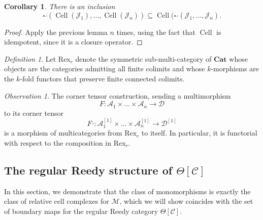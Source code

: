 \documentclass[leqno]{article}
\numberwithin{equation}{subsection}
\theoremstyle{plain}   %
\newtheorem{cor}[equation]{Corollary}
\theoremstyle{remark}
\newtheorem{obs}[equation]{Observation}
\newtheorem{defn}[equation]{Definition}
\theoremstyle{plain}
\newcommand{\Cat}{\ensuremath{\mathbf{Cat}}}
\renewcommand{\C}{\ensuremath{\mathcal{C}}}
\begin{document}
\begin{cor} 
	There is an inclusion
	\[\square^\lrcorner(\operatorname{Cell}(\mathscr{J}_1),\dots,\operatorname{Cell}(\mathscr{J}_n)) \subseteq \operatorname{Cell}(\square^\lrcorner(\mathscr{J}_1,\dots,\mathscr{J}_n).\]
\end{cor}
\begin{proof} 
	Apply the previous lemma \(n\) times, using the fact that \(\operatorname{Cell}\) is idempotent, since it is a closure operator.
\end{proof}

\begin{defn} Let \(\mathrm{Rex}_c\) denote the symmetric sub-multi-category of \(\Cat\) whose objects are the categories admitting all finite colimits and whose \(k\)-morphisms are the \(k\)-fold functors that preserve finite connected colimits.
\end{defn}
\begin{obs}\label{cornertensorfunctoriality} The corner tensor construction, sending a multimorphism 
	\[F:\mathcal{A}_1\times\dots\times \mathcal{A}_n \to \mathcal{D}\] to its corner tensor
	\[F^\lrcorner:\mathcal{A}_1^{[1]}\times\dots\times \mathcal{A}_n^{[1]} \to \mathcal{D}^{[1]}\] is a morphism of multicategories from \(\mathrm{Rex}_c\) to itself.  In particular, it is functorial with respect to the composition in \(\mathrm{Rex}_c\).
\end{obs}
\subsection{The regular Reedy structure of \(\Theta[\C]\)}\label{reedy}
In this section, we demonstrate that the class of monomorphisms is exactly the class of relative cell complexes for \(\mathscr{M}\), which we will show coincides with the set of boundary maps for the regular Reedy category \(\Theta[\C]\).  
\end{document}
